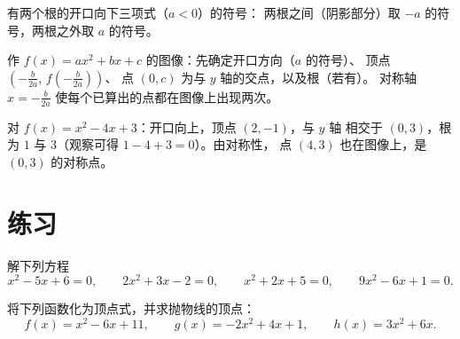 \begin{omfigure}

{\small 有两个根的开口向下三项式（$a < 0$）的符号：
两根之间（阴影部分）取 $-a$ 的符号，两根之外取 $a$ 的符号。}
\end{omfigure}

\begin{method}[抛物线的作图]\label{met:g11:quad:reading}
作 $f(x) = ax^2+bx+c$ 的图像：先确定开口方向（$a$ 的符号）、
顶点 $\left(-\frac{b}{2a},\, f\!\left(-\frac{b}{2a}\right)\right)$、
点 $(0, c)$ 为与 $y$ 轴的交点，以及根（若有）。
对称轴 $x = -\frac{b}{2a}$ 使每个已算出的点都在图像上出现两次。
\end{method}

\begin{example}
对 $f(x) = x^2 - 4x + 3$：开口向上，顶点 $(2, -1)$，与 $y$ 轴
相交于 $(0,3)$，根为 $1$ 与 $3$（观察可得 $1 - 4 + 3 = 0$）。由对称性，
点 $(4, 3)$ 也在图像上，是 $(0, 3)$ 的对称点。
\end{example}

\section{练习}

\begin{exercise}[$\star$]\label{exo:g11:quad:1}
解下列方程
\[
x^2 - 5x + 6 = 0, \qquad
2x^2 + 3x - 2 = 0, \qquad
x^2 + 2x + 5 = 0, \qquad
9x^2 - 6x + 1 = 0 .
\]
\end{exercise}

\begin{exercise}[$\star$]\label{exo:g11:quad:2}
将下列函数化为顶点式，并求抛物线的顶点：
\[
f(x) = x^2 - 6x + 11, \qquad
g(x) = -2x^2 + 4x + 1, \qquad
h(x) = 3x^2 + 6x .
\]
\end{exercise}

